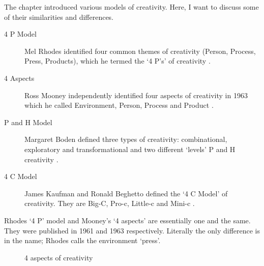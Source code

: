 The  chapter introduced various models of creativity. Here, I want to discuss some of their similarities and differences.

\begin{description}
  \item [4 P Model] Mel Rhodes identified four common themes of creativity (Person, Process, Press, Products), which he termed the `4 P\rq s' of creativity \autocite{Rhodes1961}.
  \item [4 Aspects] Ross Mooney independently identified four aspects of creativity in 1963 which he called Environment, Person, Process and Product \autocite[as cited in][]{Sternberg1999}.
  \item [P and H Model] Margaret Boden defined three types of creativity: combinational, exploratory and transformational and two different `levels' P and H creativity \autocite{Boden2003}.
  \item [4 C Model] James Kaufman and Ronald Beghetto defined the `4 C Model' of creativity. They are Big-C, Pro-c, Little-c and Mini-c \autocite{Kaufman2009}.
\end{description}


Rhodes `4 P' model and Mooney's `4 aspects' are essentially one and the same. They were published in 1961 and 1963 respectively. Literally the only difference is in the name; Rhodes calls the environment `press'.

\begin{figure}[htb] %
  \centering
  \tikzset{every fit/.append style=text badly centered}
\caption[4 aspects of creativity]{4 aspects of creativity}
\label{fig:4Crea}
\end{figure}


